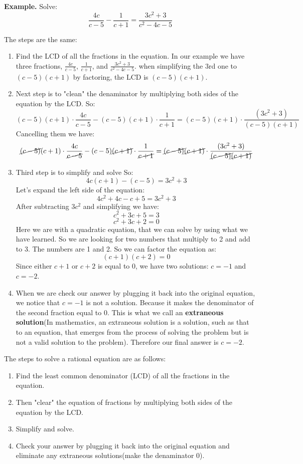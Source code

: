 \textbf{Example.} Solve: 
\begin{equation*}
    \frac{4c}{c-5} - \frac{1}{c+1} = \frac{3c^2+3}{c^2-4c-5}
\end{equation*}

The steps are the same: 
\begin{enumerate}
    \item Find the LCD of all the fractions in the equation. In our example we have three fractions, $\displaystyle \frac{4c}{c-5}$, $\displaystyle  \frac{1}{c+1}$, and $\displaystyle \frac{3c^2+3}{c^2-4c-5}$. when simplifying the 3rd one to $(c-5)(c+1)$ by factoring, the LCD is $(c-5)(c+1)$.
    \item Next step is to "clean" the denaminator  by multiplying both sides of the equation by the LCD. So:
    $$ (c-5)(c+1) \cdot \frac{4c}{c-5} - (c-5)(c+1) \cdot \frac{1}{c+1} = (c-5)(c+1) \cdot \frac{(3c^2+3)}{(c-5)(c+1)}$$
    Cancelling them we have:
    $$ \cancel{(c-5)}(c+1) \cdot \frac{4c}{\cancel{c-5}} - (c-5)\cancel{(c+1)} \cdot \frac{1}{\cancel{c+1}} = \cancel{(c-5)}\cancel{(c+1)} \cdot \frac{(3c^2+3)}{\cancel{(c-5)}\cancel{(c+1)}}$$
    \item Third step is to simplify and solve So: 
    $$ 4c(c+1) - (c-5) = 3c^2+3$$
    Let's expand the left side of the equation:
    $$ 4c^2+4c - c + 5 = 3c^2+3$$
    After subtracting $3c^2$ and simplifying we have:
    $$ c^2+3c+5 = 3$$
    $$ c^2+3c+2 = 0$$
    Here we are with a quadratic equation, that we can solve by using what we have learned. 
    So we are looking for two numbers that multiply to 2 and add to 3. The numbers are 1 and 2. So we can factor the equation as:
    $$ (c+1)(c+2) = 0$$
    Since either $c+1$ or $c+2$ is equal to 0, we have two solutions: $c = -1$ and $c = -2$.
    \item When we are check our answer by plugging it back into the original equation, we notice that $c=-1$ is not a solution. Because it makes the denominator of the second fraction equal to 0. This is what we call an \textbf{extraneous solution}(In mathematics, an extraneous solution is a solution, such as that to an equation, that emerges from the process of solving the problem but is not a valid solution to the problem).
    Therefore our final answer is $c = -2$.
\end{enumerate}
The steps to solve a rational equation are as follows:
\begin{enumerate}
    \item Find the least common denominator (LCD) of all the fractions in the equation. 
    \item Then "clear" the equation of fractions by multiplying both sides of the equation by the LCD.
    \item  Simplify and solve.
    \item Check your answer by plugging it back into the original equation and eliminate any extraneous solutions(make the denaminator 0).
\end{enumerate}